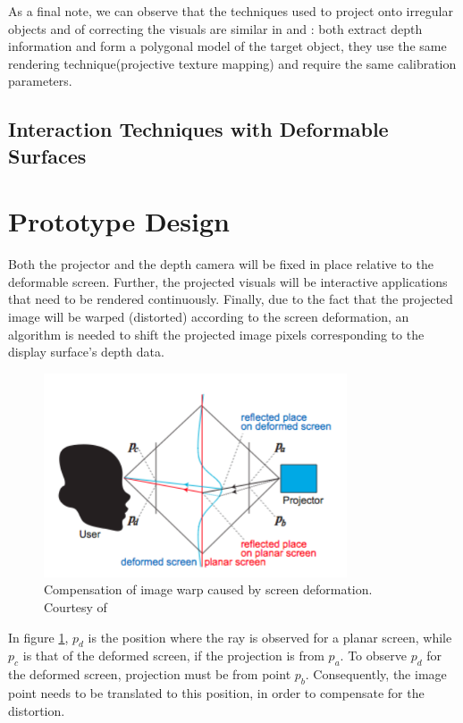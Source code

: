 \documentclass[]{article}
\begin{document}
As a final note, we can observe that the techniques used to project onto irregular objects and of correcting the visuals are similar in \cite{watanabe08} and \cite{raskar98}: both extract depth information and form a polygonal model of the target object, they use the same rendering technique(projective texture mapping) and require the same calibration parameters. 

\subsection{Interaction Techniques with Deformable Surfaces}
\newpage
\section{Prototype Design}

Both the projector and the depth camera will be fixed in place relative to the deformable screen. Further, the projected visuals will be interactive applications that need to be rendered continuously. Finally, due to the fact that the projected image will be warped (distorted) according to the screen deformation, an algorithm is needed to shift the projected image pixels corresponding to the display surface’s depth data. 

\begin{figure}[hbtp]
    \centering
    \includegraphics[width=0.8\textwidth]{figures/PointProjection.PNG}
    \caption{Compensation of image warp caused by screen deformation. Courtesy of \cite{watanabe08}}
    \label{fig:PointCompensation}
\end{figure}

In figure \ref{fig:PointCompensation}, $p_{d}$ is the position where the ray is observed for a planar screen, while $p_{c}$ is that of the deformed screen, if the projection is from $p_{a}$. To observe $p_{d}$ for the deformed screen, projection must be from point $p_{b}$. Consequently, the image point needs to be translated to this position, in order to compensate for the distortion.\\
\end{document}
